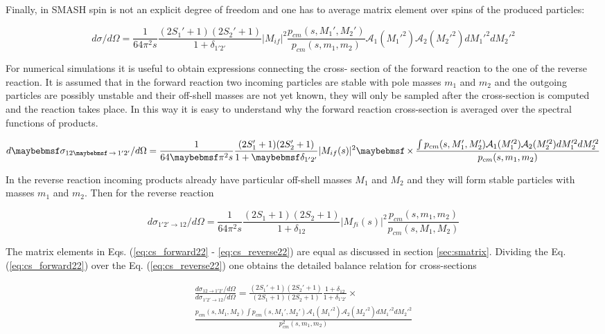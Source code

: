 Finally, in SMASH spin is not an explicit degree of freedom and one has to average
matrix element over spins of the produced particles:

\begin{equation}
  d\sigma/d\Omega =
  \frac{1}{64\pi^2 s} \frac{(2S_1'+1)(2S_2'+1)}{1+\delta_{1'2'}}|M_{if}|^2
  \frac{p_{cm}(s, M_1',M_2')}{p_{cm}(s, m_1,m_2)}
  \mathcal{A}_1(M_1'^2) \mathcal{A}_2(M_2'^2)  dM_1'^2 dM_2'^2
\end{equation}

For numerical simulations it is useful to obtain expressions connecting the cross-
section of the forward reaction to the one of the reverse reaction. It is assumed that
in the forward reaction two incoming particles are stable with pole masses $m_1$ and
$m_2$ and the outgoing particles are possibly unstable and their off-shell
masses are not yet known, they will only be sampled after the cross-section is
computed and the reaction takes place.  In this way it is easy to understand
why the forward reaction cross-section is averaged over the spectral functions
of products.

\begin{equation} \label{eq:cs_forward22}
  d\sigma_{12 \to 1'2'}/d\Omega =
  \frac{1}{64\pi^2 s} \frac{(2S_1'+1)(2S_2'+1)}{1+\delta_{1'2'}}|M_{if}(s)|^2 \times \nonumber \\
  \frac{  \int p_{cm}(s, M_1',M_2') \mathcal{A}_1(M_1'^2) \mathcal{A}_2(M_2'^2)  dM_1'^2 dM_2'^2 }
  {p_{cm}(s, m_1,m_2)}
\end{equation}

In the reverse reaction incoming products already have particular off-shell
masses $M_1$ and $M_2$ and they will form stable particles with masses $m_1$ and
$m_2$. Then for the reverse reaction

\begin{equation} \label{eq:cs_reverse22}
  d\sigma_{1'2' \to 12}/d\Omega =
  \frac{1}{64\pi^2 s} \frac{(2S_1+1)(2S_2+1)}{1+\delta_{12}}|M_{fi}(s)|^2
  \frac{p_{cm}(s, m_1,m_2)} {p_{cm}(s, M_1,M_2)}
\end{equation}

The matrix elements in Eqs. (\ref{eq:cs_forward22} - \ref{eq:cs_reverse22}) are equal
as discussed in section \ref{sec:smatrix}. Dividing the Eq. (\ref{eq:cs_forward22})
over the Eq. (\ref{eq:cs_reverse22}) one obtains the detailed balance relation
for cross-sections

\begin{align}
  \frac{d\sigma_{12\to 1'2'}/d\Omega}{d\sigma_{1'2'\to 12}/d\Omega} =
  \frac{(2S_1'+1)(2S_2'+1)}{(2S_1+1)(2S_2+1)} \frac{1+\delta_{12}}{1+\delta_{1'2'}} \times \nonumber \\
  \frac{p_{cm}(s, M_1,M_2)\int p_{cm}(s, M_1',M_2')
  \mathcal{A}_1(M_1'^2) \mathcal{A}_2(M_2'^2) dM_1'^2 dM_2'^2 }{p^2_{cm}(s, m_1,m_2)}
\end{align}


